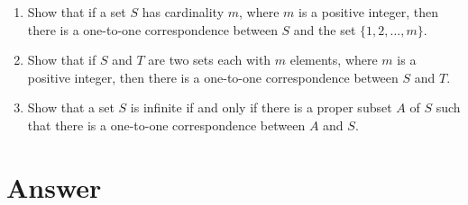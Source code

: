 \documentclass{sig-alternate-05-2015}
\begin{document}
\begin{enumerate}
\item Show that if a set $S$ has cardinality $m$, where $m$ is a
positive integer, then there is a one-to-one correspondence
between $S$ and the set $\{1, 2, . . . , m\}$.

\item Show that if $S$ and $T$ are two sets each with $m$ elements,
where $m$ is a positive integer, then there is a
one-to-one correspondence between $S$ and $T$.

\item Show that a set $S$ is infinite if and only if there is a proper
subset $A$ of $S$ such that there is a one-to-one correspondence
between $A$ and $S$.
\end{enumerate}


\nocite{*}

 
\newpage
\appendix
\section{Answer}
\end{document}
